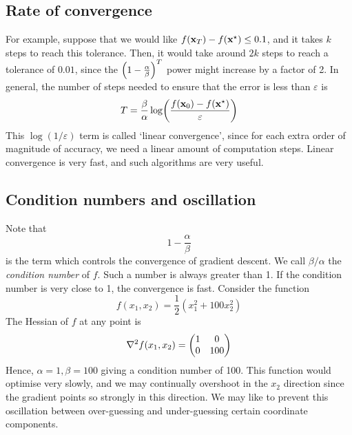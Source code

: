 \subsection{Rate of convergence}
For example, suppose that we would like \(f(\vb x_T)  - f(\vb x^\star) \leq 0.1\), and it takes \(k\) steps to reach this tolerance.
Then, it would take around \(2k\) steps to reach a tolerance of \(0.01\), since the \(\qty(1 - \frac{\alpha}{\beta})^T\) power might increase by a factor of 2.
In general, the number of steps needed to ensure that the error is less than \(\varepsilon\) is
\[
	T = \frac{\beta}{\alpha} \log(\frac{f(\vb x_0) - f(\vb x^\star)}{\varepsilon})
\]
This \(\log(1/\varepsilon)\) term is called `linear convergence', since for each extra order of magnitude of accuracy, we need a linear amount of computation steps.
Linear convergence is very fast, and such algorithms are very useful.

\subsection{Condition numbers and oscillation}
Note that
\[
	1 - \frac{\alpha}{\beta}
\]
is the term which controls the convergence of gradient descent.
We call \(\beta/\alpha\) the \textit{condition number} of \(f\).
Such a number is always greater than 1.
If the condition number is very close to 1, the convergence is fast.
Consider the function
\[
	f(x_1, x_2) = \frac{1}{2}(x_1^2 + 100x_2^2)
\]
The Hessian of \(f\) at any point is
\[
	\laplacian{f(x_1, x_2)} = \begin{pmatrix}
		1 & 0 \\ 0 & 100
	\end{pmatrix}
\]
Hence, \(\alpha = 1, \beta = 100\) giving a condition number of 100.
This function would optimise very slowly, and we may continually overshoot in the \(x_2\) direction since the gradient points so strongly in this direction.
We may like to prevent this oscillation between over-guessing and under-guessing certain coordinate components.

